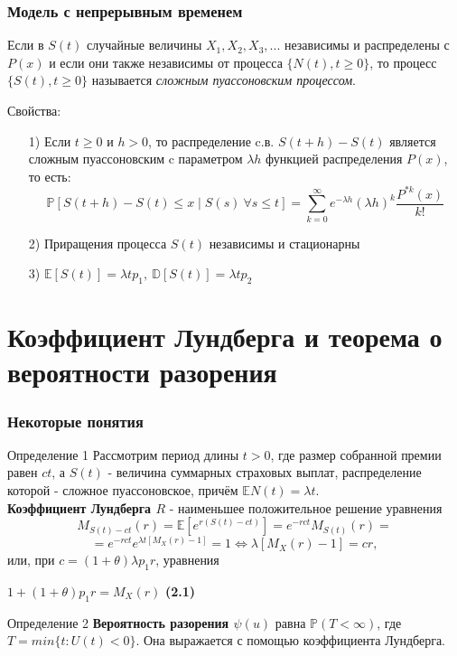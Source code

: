\documentclass[10pt]{beamer}
\begin{document}
\begin{frame}
\frametitle{Модель с непрерывным временем} 
Если в $S(t)$ случайные величины $X_{1}, X_{2}, X_{3}, ...$ независимы и распределены с $P(x)$ и если они также независимы от процесса $\big\{N(t), t\geq 0\big\}$, то процесс $\big\{S(t), t\geq 0\big\}$ называется \textit{сложным пуассоновским процессом}.
\begin{block} {Свойства:}
\begin{enumerate}
    \item[1)] Если $t\geq 0 $ и $h > 0$, то распределение c.в. $S(t + h) - S(t)$ является сложным пуассоновским c параметром $\lambda h$ функцией распределения $P(x)$, то есть:
    \begin{equation*}
        \mathbb{P}[S(t+h)-S(t)\leq x \mid S(s)\ \forall s \leq t] = 
        \sum_{k=0}^{ \infty }e^{- \lambda h}(\lambda h)^{k} \frac{P^{\ast k}(x) }{k!}
    \end{equation*}
    \item[2)] Приращения процесса $S(t)$ независимы и стационарны
    \item[3)] $\mathbb{E}[S(t)] = \lambda t p_1,\ \mathbb{D}[S(t)] = \lambda t p_2$
\end{enumerate}
\end{block}
\end{frame}


\section{Коэффициент Лундберга и теорема о вероятности разорения}
\begin{frame}
\frametitle{Некоторые понятия}
\begin{block}{Определение 1}
Рассмотрим период длины $t > 0$, где размер собранной  премии равен $ct$, а $S(t)$ - величина суммарных страховых выплат, распределение которой - сложное пуассоновское, причём $\mathbb{E}N(t) = {\lambda}t$.
\\ \textbf{Коэффициент Лундберга ${R}$} - наименьшее положительное решение уравнения $$M_{S(t)-ct}(r) = \mathbb{E}[e^{r(S(t)-ct)}] = e^{-rct}M_{S(t)}(r) = $$ $$= e^{-rct}e^{{\lambda}t[M_{X}(r)-1]} = 1 \Leftrightarrow {\lambda}[M_{X}(r)-1] = cr,$$или, при $c = (1+{\theta}){\lambda}p_{1}r$, уравнения 
\begin{center}$1+(1+\theta)p_{1}r = M_{X}(r)$ \textbf{(2.1)} \end{center}
\end{block}
\begin{block}{Определение 2}
\textbf{Вероятность разорения $\psi(u)$} равна $\mathbb{P}(T < \infty)$, где $T = min\{t: U(t) < 0\}$. Она выражается с помощью коэффициента Лундберга.
\end{block}
\end{frame}
\end{document}
